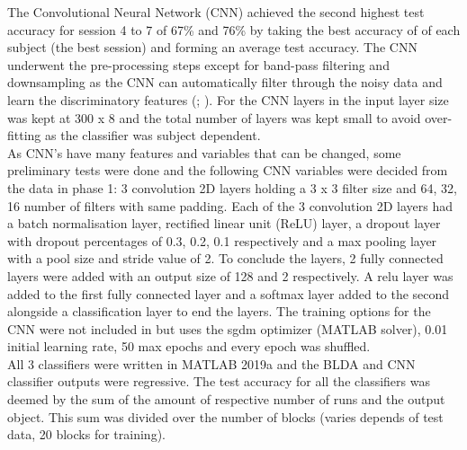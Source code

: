 The Convolutional Neural Network (CNN) achieved the second highest test accuracy for session 4 to 7 of 67\% and 76\% by taking the best accuracy of of each subject (the best session) and forming an average test accuracy. The CNN underwent the pre-processing steps except for band-pass filtering and downsampling as the CNN can automatically filter through the noisy data and learn the discriminatory features (\cite{PalaniPaper}; \cite{8EEGCNN}). For the CNN layers in the input layer size was kept at 300 x 8 and the total number of layers was kept small to avoid over-fitting as the classifier was subject dependent. \\

As CNN's have many features and variables that can be changed, some preliminary tests were done and the following CNN variables were decided from the data in phase 1: 3 convolution 2D layers holding a 3 x 3 filter size and 64, 32, 16 number of filters with same padding. Each of the 3 convolution 2D layers had a batch normalisation layer, rectified linear unit (ReLU) layer, a dropout layer with dropout percentages of 0.3, 0.2, 0.1 respectively and a max pooling layer with a pool size and stride value of 2. To conclude the layers, 2 fully connected layers were added with an output size of 128 and 2 respectively. A relu layer was added to the first fully connected layer and a softmax layer added to the second alongside a classification layer to end the layers. The training options for the CNN were not included in \cite{PalaniPaper} but uses the sgdm optimizer (MATLAB solver), 0.01 initial learning rate, 50 max epochs and every epoch was shuffled. \\
 
All 3 classifiers were written in MATLAB 2019a and the BLDA and CNN classifier outputs were regressive. The test accuracy for all the classifiers was deemed by the sum of the amount of respective number of runs and the output object. This sum was divided over the number of blocks (varies depends of test data, 20 blocks for training).